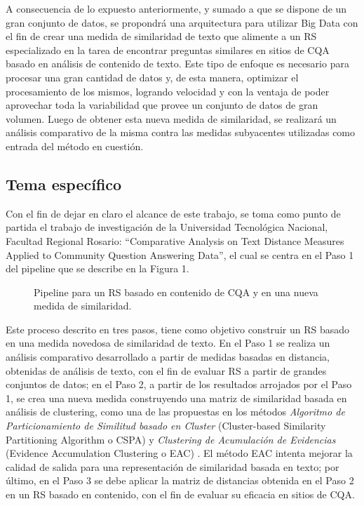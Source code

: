 \bigskip A consecuencia de lo expuesto anteriormente, y sumado a que se dispone de un gran conjunto de datos, se propondrá una arquitectura para utilizar Big Data con el fin de crear una medida de similaridad de texto que alimente a un RS especializado en la tarea de encontrar preguntas similares en sitios de CQA basado en análisis de contenido de texto. Este tipo de enfoque es necesario para procesar una gran cantidad de datos y, de esta manera, optimizar el procesamiento de los mismos, logrando velocidad y con la ventaja de poder aprovechar toda la variabilidad que provee un conjunto de datos de gran volumen. Luego de obtener esta nueva medida de similaridad, se realizará un análisis comparativo de la misma contra las medidas subyacentes utilizadas como entrada del método en cuestión.

\subsection{Tema específico}
\noindent Con el fin de dejar en claro el alcance de este trabajo, se toma como punto de partida el trabajo de investigación de la Universidad Tecnológica Nacional, Facultad Regional Rosario: “Comparative Analysis on Text Distance Measures Applied to Community Question Answering Data”, el cual se centra en el Paso 1 del pipeline que se describe en la Figura 1. 

\begin{figure}
	\def\svgwidth{\linewidth}
	
	\caption{Pipeline para un RS basado en contenido de CQA y en una nueva medida de similaridad.}
\end{figure}

\bigskip Este proceso descrito en tres pasos, tiene como objetivo construir un RS basado en una medida novedosa de similaridad de texto. En el Paso 1 se realiza un análisis comparativo desarrollado a partir de medidas basadas en distancia, obtenidas de análisis de texto, con el fin de evaluar RS a partir de grandes conjuntos de datos; en el Paso 2, a partir de los resultados arrojados por el Paso 1, se crea una nueva medida construyendo una matriz de similaridad basada en análisis de clustering, como una de las propuestas en los métodos \textit{Algoritmo de Particionamiento de Similitud basado en Cluster} (Cluster-based Similarity Partitioning Algorithm o CSPA) \citep{strehl33knowledge} y \textit{Clustering de Acumulación de Evidencias} (Evidence Accumulation Clustering o EAC) \citep{fred2005combining}. El método EAC intenta mejorar la calidad de salida para una representación de similaridad basada en texto; por último, en el Paso 3 se debe aplicar la matriz de distancias obtenida en el Paso 2 en un RS basado en contenido, con el fin de evaluar su eficacia en sitios de CQA. 

